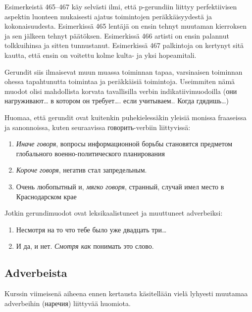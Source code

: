 \documentclass[]{scrartcl}
\providecommand{\tightlist}{%
  \setlength{\itemsep}{0pt}\setlength{\parskip}{0pt}}
\begin{document}
Esimerkeistä 465--467 käy selvästi ilmi, että p-gerundiin liittyy
perfektiivisen aspektin luonteen mukaisesti ajatus toimintojen
peräkkäisyydestä ja kokonaisuudesta. Esimerkissä 465 lentäjä on ensin
tehnyt muutaman kierroksen ja sen jälkeen tehnyt päätöksen. Esimerkissä
466 artisti on ensin palannut tolkkuihinsa ja sitten tunnustanut.
Esimerkissä 467 palkintoja on kertynyt sitä kautta, että ensin on
voitettu kolme kulta- ja yksi hopeamitali.

Gerundit siis ilmaisevat muun muassa toiminnan tapaa, varsinaisen
toiminnan ohessa tapahtunutta toimintaa ja peräkkäisiä toimintoja.
Useimmiten nämä muodot olisi mahdollista korvata tavallisilla verbin
indikatiivimuodoilla (они нагруживают\ldots{} в котором он
требует\ldots{}. если учитываем.. Когда гдядишь\ldots{})

Huomaa, että gerundit ovat kuitenkin puhekielessäkin yleisiä monissa
fraaseissa ja sanonnoissa, kuten seuraavissa говорить-verbiin
liittyvissä:

\begin{enumerate}
\def\labelenumi{(\arabic{enumi})}
\setcounter{enumi}{467}
\tightlist
\item
  \emph{Иначе говоря}, вопросы информационной борьбы становятся
  предметом глобального военно-политического планирования
\item
  \emph{Короче говоря}, негатив стал запредельным.
\item
  Очень любопытный и, \emph{мягко говоря}, странный, случай имел место в
  Краснодарском крае
\end{enumerate}

Jotkin gerundimuodot ovat leksikaalistuneet ja muuttuneet adverbeiksi:

\begin{enumerate}
\def\labelenumi{(\arabic{enumi})}
\setcounter{enumi}{470}
\tightlist
\item
  Несмотря на то что тебе было уже двадцать три\ldots{}
\item
  И да, и нет. \emph{Смотря как} понимать это слово.
\end{enumerate}

\subsection{Adverbeista}\label{adverbeista}

Kurssin viimeisenä aiheena ennen kertausta käsitellään vielä lyhyesti
muutamaa adverbeihin (наречия) liittyvää huomiota.
\end{document}
